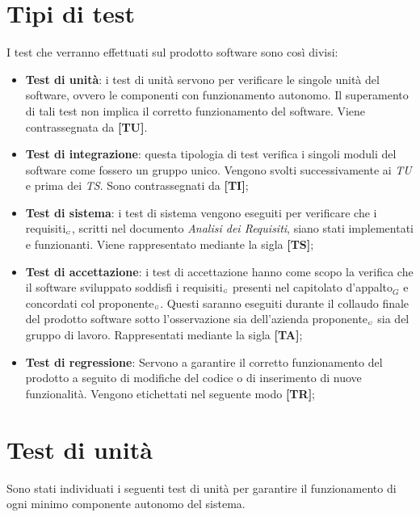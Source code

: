 \section{Tipi di test} \label{SpecificaDeiTestTipiDiTest}
I test che verranno effettuati sul prodotto software sono così divisi:
\begin{itemize}
	\item \textbf{Test di unità}: i test di unità servono per verificare le singole unità del software, ovvero le componenti con funzionamento autonomo.
	Il superamento di tali test non implica il corretto funzionamento del software.
	Viene contrassegnata da \textbf{[TU]}.

	\item \textbf{Test di integrazione}: questa tipologia di test verifica i singoli moduli del software come fossero un gruppo unico.
	Vengono svolti successivamente ai \textit{TU} e prima dei \textit{TS}.
	Sono contrassegnati da \textbf{[TI]};

	\item \textbf{Test di sistema}: i test di sistema vengono eseguiti per verificare che i requisiti$_{\scaleto{G}{3pt}}$, scritti nel documento \textit{Analisi dei Requisiti}, siano stati implementati e funzionanti.
	Viene rappresentato mediante la sigla \textbf{[TS]};

	\item \textbf{Test di accettazione}: i test di accettazione hanno come scopo la verifica che il software sviluppato soddisfi i requisiti$_{\scaleto{G}{3pt}}$ presenti nel capitolato d’appalto$_G$ e concordati col proponente$_{\scaleto{G}{3pt}}$.
	Questi saranno eseguiti durante il collaudo finale del prodotto software sotto l'osservazione sia dell'azienda proponente$_{\scaleto{G}{3pt}}$ sia del gruppo di lavoro.
	Rappresentati mediante la sigla \textbf{[TA]};

	\item \textbf{Test di regressione}: Servono a garantire il corretto funzionamento del prodotto a seguito di modifiche del codice o di inserimento di nuove funzionalità.
	Vengono etichettati nel seguente modo \textbf{[TR]};

\end{itemize}

\clearpage
\section{Test di unità}\label{SpecificaDeiTestTestDiUnita}
Sono stati individuati i seguenti test di unità per garantire il funzionamento di ogni minimo componente autonomo del sistema.


